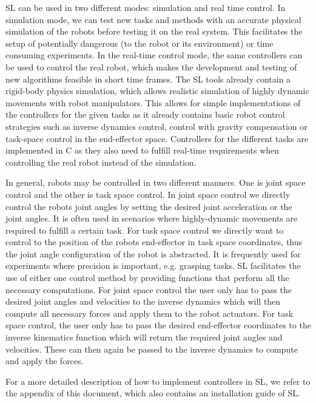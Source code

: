 \documentclass[11pt, article, colorback]{article}
\begin{document}
SL can be used in two different modes: simulation and real time control. In simulation mode, we can test new tasks and 
methods with an accurate physical simulation of the robots before testing it on the real 
system. This facilitates the setup of potentially dangerous (to the robot or its environment) or time 
consuming experiments. In the real-time control mode, the same controllers can be used to 
control the real robot, which makes the development and testing of new algorithms feasible in 
short time frames. The SL tools already contain a rigid-body physics simulation, which allows realistic simulation of highly dynamic movements
with robot manipulators. This allows for simple implementations of the controllers for the given tasks as it already contains basic robot control strategies such as
inverse dynamics control, control with gravity compensation or task-space control in the end-effector space. Controllers for the different tasks are implemented in C as they
also need to fulfill real-time requirements when controlling the real robot instead of the simulation. 

In general, robots may be controlled in two different manners. One is joint space control and the other is task space control. 
In joint space control we directly control the robots joint angles by setting the desired joint acceleration or the joint angles. It is often used in scenarios where highly-dynamic movements 
are required to fulfill a certain task. For task space control we directly want to control to the position of the robots end-effector in task 
space coordinates, thus the joint angle configuration of the robot is abstracted. It is frequently used for experiments where precision is important, e.g. grasping tasks. 
SL facilitates the use of either one control method by providing functions that perform all the necessary computations. For 
joint space control the user only has to pass the desired joint angles and velocities to the inverse dynamics which will then compute 
all necessary forces and apply them to the robot actuators. For task space control, the user only has to pass the desired 
end-effector coordinates to the inverse kinematics function which will return the required joint angles and velocities. These can then 
again be passed to the inverse dynamics to compute and apply the forces. 

For a more detailed description of how to implement controllers in SL, we refer to the 
appendix of this document, which also contains an installation guide of SL. 
\end{document}
